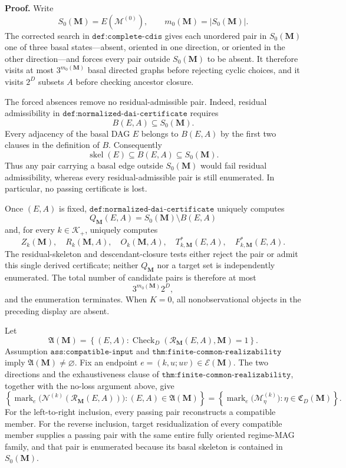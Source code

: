 \textbf{Proof.}
Write
\[
S_0(\mathbf M)=E(\mathcal M^{(0)}),
\qquad
m_0(\mathbf M)=|S_0(\mathbf M)|.
\]
The corrected search in \(\texttt{def:complete-cdis}\) gives each unordered pair in \(S_0(\mathbf M)\) one of three basal states---absent, oriented in one direction, or oriented in the other direction---and forces every pair outside \(S_0(\mathbf M)\) to be absent.  It therefore visits at most \(3^{m_0(\mathbf M)}\) basal directed graphs before rejecting cyclic choices, and it visits \(2^D\) subsets \(A\) before checking ancestor closure.

The forced absences remove no residual-admissible pair.  Indeed, residual admissibility in \(\texttt{def:normalized-dai-certificate}\) requires
\[
B(E,A)\subseteq S_0(\mathbf M).
\]
Every adjacency of the basal DAG \(E\) belongs to \(B(E,A)\) by the first two clauses in the definition of \(B\).  Consequently
\[
\operatorname{skel}(E)\subseteq B(E,A)\subseteq S_0(\mathbf M).
\]
Thus any pair carrying a basal edge outside \(S_0(\mathbf M)\) would fail residual admissibility, whereas every residual-admissible pair is still enumerated.  In particular, no passing certificate is lost.

Once \((E,A)\) is fixed, \(\texttt{def:normalized-dai-certificate}\) uniquely computes
\[
Q_{\mathbf M}(E,A)=S_0(\mathbf M)\setminus B(E,A)
\]
and, for every \(k\in\mathcal K_+\), uniquely computes
\[
Z_k(\mathbf M),\quad R_k(\mathbf M,A),\quad O_k(\mathbf M,A),
\quad T^*_{k,\mathbf M}(E,A),\quad F^*_{k,\mathbf M}(E,A).
\]
The residual-skeleton and descendant-closure tests either reject the pair or admit this single derived certificate; neither \(Q_{\mathbf M}\) nor a target set is independently enumerated.  The total number of candidate pairs is therefore at most
\[
3^{m_0(\mathbf M)}2^D,
\]
and the enumeration terminates.  When \(K=0\), all nonobservational objects in the preceding display are absent.

Let
\[
\mathfrak A(\mathbf M)=
\left\{(E,A):
\operatorname{Check}_{D}(\mathcal R_{\mathbf M}(E,A),\mathbf M)=1
\right\}.
\]
Assumption \(\texttt{ass:compatible-input}\) and \(\texttt{thm:finite-common-realizability}\) imply \(\mathfrak A(\mathbf M)\ne\varnothing\).  Fix an endpoint \(e=(k,u;uv)\in\mathcal E(\mathbf M)\).  The two directions and the exhaustiveness clause of \(\texttt{thm:finite-common-realizability}\), together with the no-loss argument above, give
\[
\left\{
\operatorname{mark}_e\bigl(\mathcal N^{(k)}(\mathcal R_{\mathbf M}(E,A))\bigr):
(E,A)\in\mathfrak A(\mathbf M)
\right\}
=
\left\{
\operatorname{mark}_e\bigl(\mathcal M_\eta^{(k)}\bigr):
\eta\in\mathfrak C_D(\mathbf M)
\right\}.
\]
For the left-to-right inclusion, every passing pair reconstructs a compatible member.  For the reverse inclusion, target residualization of every compatible member supplies a passing pair with the same entire fully oriented regime-MAG family, and that pair is enumerated because its basal skeleton is contained in \(S_0(\mathbf M)\).

